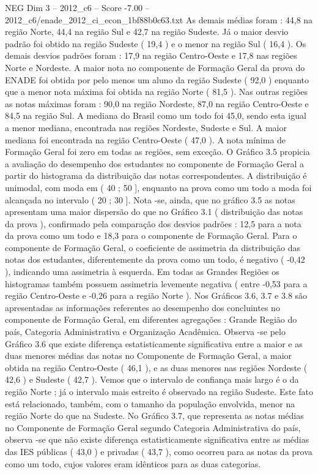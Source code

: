 \begin{textsample}{NEG Dim 3 – 2012\_c6 – Score -7.00 – 2012\_c6/enade\_2012\_ci\_econ\_1bf88b0c63.txt}
As demais médias foram : 44,8 na região Norte, 44,4 na região Sul e 42,7 na região Sudeste.
Já o maior desvio padrão foi obtido na região Sudeste ( 19,4 ) e o menor na região Sul ( 16,4 ).
Os demais desvios padrões foram : 17,9 na região Centro-Oeste e 17,8 nas regiões Norte e Nordeste.
A maior nota no componente de Formação Geral da prova do ENADE foi obtida por pelo menos um aluno da região Sudeste ( 92,0 ) enquanto que a menor nota máxima foi obtida na região Norte ( 81,5 ).
Nas outras regiões as notas máximas foram : 90,0 na região Nordeste, 87,0 na região Centro-Oeste e 84,5 na região Sul.
A mediana do Brasil como um todo foi 45,0, sendo esta igual a menor mediana, encontrada nas regiões Nordeste, Sudeste e Sul.
A maior mediana foi encontrada na região Centro-Oeste ( 47,0 ).
A nota mínima de Formação Geral foi zero em todas as regiões, sem exceção.
O Gráfico 3.5 propicia a avaliação do desempenho dos estudantes no componente de Formação Geral a partir do histograma da distribuição das notas correspondentes.
A distribuição é unimodal, com moda em ( 40 ; 50 ], enquanto na prova como um todo a moda foi alcançada no intervalo ( 20 ; 30 ].
Nota -se, ainda, que no gráfico 3.5 as notas apresentam uma maior dispersão do que no Gráfico 3.1 ( distribuição das notas da prova ), confirmado pela comparação dos desvios padrões : 12,5 para a nota da prova como um todo e 18,3 para o componente de Formação Geral.
Para o componente de Formação Geral, o coeficiente de assimetria da distribuição das notas dos estudantes, diferentemente da prova como um todo, é negativo ( -0,42 ), indicando uma assimetria à esquerda.
Em todas as Grandes Regiões os histogramas também possuem assimetria levemente negativa ( entre -0,53 para a região Centro-Oeste e -0,26 para a região Norte ).
Nos Gráficos 3.6, 3.7 e 3.8 são apresentadas as informações referentes ao desempenho dos concluintes no componente de Formação Geral, em diferentes agregações : Grande Região do país, Categoria Administrativa e Organização Acadêmica.
Observa -se pelo Gráfico 3.6 que existe diferença estatisticamente significativa entre a maior e as duas menores médias das notas no Componente de Formação Geral, a maior obtida na região Centro-Oeste ( 46,1 ), e as duas menores nas regiões Nordeste ( 42,6 ) e Sudeste ( 42,7 ).
Vemos que o intervalo de confiança mais largo é o da região Norte ; já o intervalo mais estreito é observado na região Sudeste.
Este fato está relacionado, também, com o tamanho da população envolvida, menor na região Norte do que na Sudeste.
No Gráfico 3.7, que representa as notas médias no Componente de Formação Geral segundo Categoria Administrativa do país, observa -se que não existe diferença estatisticamente significativa entre as médias das IES públicas ( 43,0 ) e privadas ( 43,7 ), como ocorreu para as notas da prova como um todo, cujos valores eram idênticos para as duas categorias.

\end{textsample}
